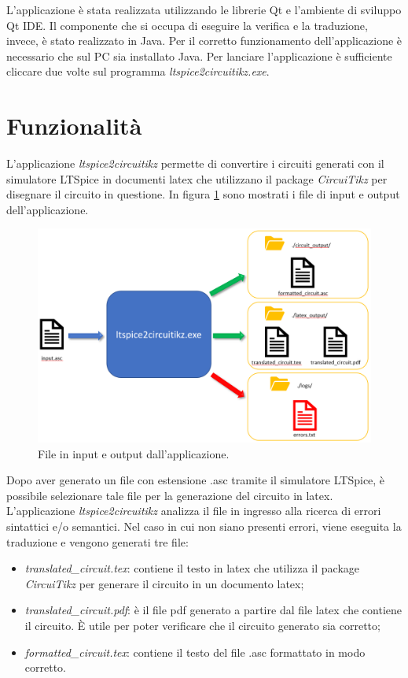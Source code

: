 L'applicazione è stata realizzata utilizzando le librerie Qt e l'ambiente di sviluppo Qt IDE. Il componente che si occupa di eseguire la verifica e la traduzione, invece, è stato realizzato in Java. Per il corretto funzionamento dell'applicazione è necessario che sul PC sia installato Java. Per lanciare l'applicazione è sufficiente cliccare due volte sul programma \textit{ltspice2circuitikz.exe}.

\section{Funzionalità}
L'applicazione \textit{ltspice2circuitikz} permette di convertire i circuiti generati con il simulatore LTSpice in documenti latex che utilizzano il package \textit{CircuiTikz} per disegnare il circuito in questione. In figura \ref{fig:schema} sono mostrati i file di input e output dell'applicazione. 
\begin{figure}[h!]
	\centering
	\includegraphics[width=1\textwidth]{./ImageFiles/schema funzionamento.png}
	\caption{File in input e output dall'applicazione.}
	\label{fig:schema}
\end{figure}
Dopo aver generato un file con estensione .asc tramite il simulatore LTSpice, è possibile selezionare tale file per la generazione del circuito in latex. L'applicazione \textit{ltspice2circuitikz} analizza il file in ingresso alla ricerca di errori sintattici e/o semantici. Nel caso in cui non siano presenti errori, viene eseguita la traduzione e vengono generati tre file:
\begin{itemize}
	\item \textit{translated\_circuit.tex}: contiene il testo in latex che utilizza il package \textit{CircuiTikz} per generare il circuito in un documento latex;
	\item \textit{translated\_circuit.pdf}: è il file pdf generato a partire dal file latex che contiene il circuito. È utile per poter verificare che il circuito generato sia corretto;
	\item \textit{formatted\_circuit.tex}: contiene il testo del file .asc formattato in modo corretto.
\end{itemize}
